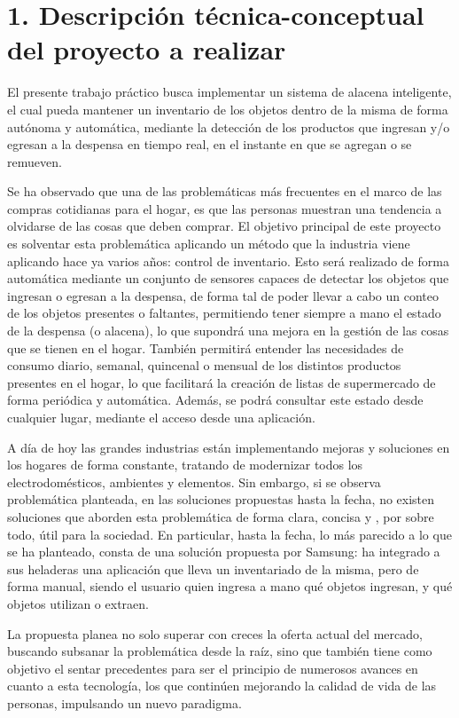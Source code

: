\documentclass[
11pt, %
codirector, %
]{charter}
\begin{document}
\section{1. Descripción técnica-conceptual del proyecto a realizar}
\label{sec:descripcion}



El presente trabajo práctico busca implementar un sistema de alacena inteligente, el cual pueda mantener un inventario de los objetos dentro de la misma de forma autónoma y automática, mediante la detección de los productos que ingresan y/o egresan a la despensa en tiempo real, en el instante en que se agregan o se remueven.

Se ha observado que  una de las problemáticas más frecuentes en el marco de las compras cotidianas para el hogar, es que las personas muestran una tendencia a olvidarse de las cosas que deben comprar. El objetivo principal de este proyecto es solventar esta problemática aplicando un método que la industria viene aplicando hace ya varios años: control de inventario. Esto será realizado de forma automática mediante un conjunto de sensores capaces de detectar los objetos que ingresan o egresan a la despensa, de forma tal de poder llevar a cabo un conteo de los objetos presentes o faltantes, permitiendo tener siempre a mano el estado de la despensa (o alacena), lo que supondrá una mejora en la gestión de las cosas que se tienen en el hogar. También permitirá entender las necesidades de consumo diario, semanal, quincenal o mensual de los distintos productos presentes en el hogar, lo que facilitará la creación de listas de supermercado de forma periódica y automática. Además, se podrá consultar este estado desde cualquier lugar, mediante el acceso desde una aplicación. 

A día de hoy las grandes industrias están implementando mejoras y soluciones en los hogares de forma constante, tratando de modernizar todos los electrodomésticos, ambientes y elementos. Sin embargo, si se observa problemática planteada, en las soluciones propuestas hasta la fecha, no existen soluciones que aborden esta problemática de forma clara, concisa y , por sobre todo, útil para la sociedad. En particular, hasta la fecha, lo más parecido a lo que se ha planteado, consta de una solución propuesta por Samsung: ha integrado a sus heladeras una aplicación que lleva un inventariado de la misma, pero de forma manual, siendo el usuario quien ingresa a mano qué objetos ingresan, y qué objetos utilizan o extraen.

La propuesta planea no solo superar con creces la oferta actual del mercado, buscando subsanar la problemática desde la raíz, sino que también tiene como objetivo el sentar precedentes para ser el principio de numerosos avances en cuanto a esta tecnología, los que continúen mejorando la calidad de vida de las personas, impulsando un nuevo paradigma. 
\end{document}
